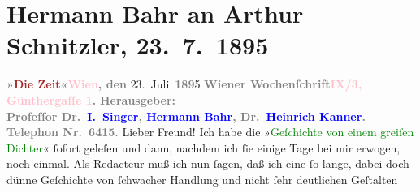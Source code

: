 

               \section[Hermann Bahr an Arthur Schnitzler, 23. 7. 1895]{ Hermann Bahr an Arthur Schnitzler, 23. 7. 1895}\nopagebreak{}\rehead{ }\normalsize\beginnumbering{} \toendnotes[C]{\smallbreak\pagebreak[2]} 
\toendnotes[C]{\smallbreak}\pstart
           \noindent{}{\pb}\textcolor{gray}{\textbf{»\textcolor{brown}{Die
                        Zeit}{}\ledrightnote{\textcolor{brown}{Die Zeit. Wiener Wochenschrift}}«}}\hfill \textcolor{gray}{\textbf{\textbf{\textcolor{pink}{Wien}{}\ledrightnote{\textcolor{pink}{Wien}}}, den }}23. Juli \textcolor{gray}{\textbf{189}}5\pend
           \pstart
           \textcolor{gray}{\textbf{Wiener Wochenſchrift}}\hfill \textcolor{gray}{\textbf{\textcolor{pink}{IX/3, Günthergaſſe 1}{}\ledrightnote{\textcolor{pink}{Günthergasse}}.}}\pend
           \pstart
           \textcolor{gray}{\textbf{\textbf{Herausgeber}:}}{\\}\textcolor{gray}{\textbf{Profeſſor Dr. \textcolor{blue}{I. Singer}{}\ledrightnote{\textcolor{blue}{Isidor Singer}}, \textcolor{blue}{Hermann Bahr}{}\ledrightnote{\textcolor{blue}{Hermann Bahr}},
                        Dr. \textcolor{blue}{Heinrich Kanner}{}\ledrightnote{\textcolor{blue}{Heinrich Kanner}}.}}\pend
           \pstart
           \textcolor{gray}{\textbf{Telephon Nr. 6415.}}\pend
           \pstart{}Lieber Freund!\pend\pstart
           Ich habe die »\textcolor{green}{Geſchichte von einem greiſen
                  Dichter}{}\ledrightnote{\textcolor{green}{Später Ruhm}}« ſofort geleſen und dann, nachdem ich ſie einige Tage bei mir
               erwogen, noch einmal. Als Redacteur muß ich nun ſagen, daß ich eine ſo lange, dabei
               doch dünne Geſchichte von ſchwacher Handlung und nicht ſehr deutlichen Geſtalten
